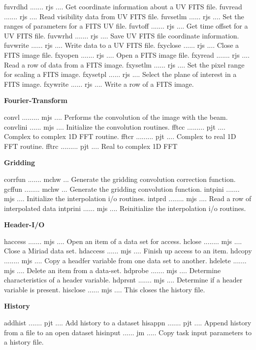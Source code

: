 {\eightpoint\begintt
fuvrdhd ....... rjs .... Get coordinate information about a UV FITS file.
fuvread ....... rjs .... Read visibility data from UV FITS file.
fuvsetlm ...... rjs .... Set the ranges of parameters for a FITS UV file.
fuvtoff ....... rjs .... Get time offset for a UV FITS file.
fuvwrhd ....... rjs .... Save UV FITS file coordinate information.
\endtt}
{\eightpoint\begintt
fuvwrite ...... rjs .... Write data to a UV FITS file.
fxyclose ...... rjs .... Close a FITS image file.
fxyopen ....... rjs .... Open a FITS image file.
fxyread ....... rjs .... Read a row of data from a FITS image.
fxysetlm ...... rjs .... Set the pixel range for scaling a FITS image.
\endtt}
{\eightpoint\begintt
fxysetpl ...... rjs .... Select the plane of interest in a FITS image.
fxywrite ...... rjs .... Write a row of a FITS image.
\endtt}
\par\centerline{\bf Fourier-Transform}
{\eightpoint\begintt
convl ......... mjs .... Performs the convolution of the image with the beam.
convlini ...... mjs .... Initialize the convolution routines.
fftcc ......... pjt .... Complex to complex 1D FFT routine.
fftcr ......... pjt .... Complex to real 1D FFT routine.
fftrc ......... pjt .... Real to complex 1D FFT
\endtt}
\par\centerline{\bf Gridding}
{\eightpoint\begintt
corrfun ....... mchw ... Generate the gridding convolution correction function.
gcffun ........ mchw ... Generate the gridding convolution function.
intpini ....... mjs .... Initialize the interpolation i/o routines.
intprd ........ mjs .... Read a row of interpolated data
intprini ...... mjs .... Reinitialize the interpolation i/o routines.
\endtt}
\par\centerline{\bf Header-I/O}
{\eightpoint\begintt
haccess ....... mjs .... Open an item of a data set for access.
hclose ........ mjs .... Close a Miriad data set.
hdaccess ...... mjs .... Finish up access to an item.
hdcopy ........ mjs .... Copy a headfer variable from one data set to another.
hdelete ....... mjs .... Delete an item from a data-set.
\endtt}
{\eightpoint\begintt
hdprobe ....... mjs .... Determine characteristics of a header variable.
hdprsnt ....... mjs .... Determine if a header variable is present.
hisclose ...... mjs .... This closes the history file.
\endtt}
\par\centerline{\bf History}
{\eightpoint\begintt
addhist ....... pjt .... Add history to a dataset
hisappn ....... pjt .... Append history from a file to an open dataset
hisinput ...... jm ..... Copy task input parameters to a history file.
\endtt}
